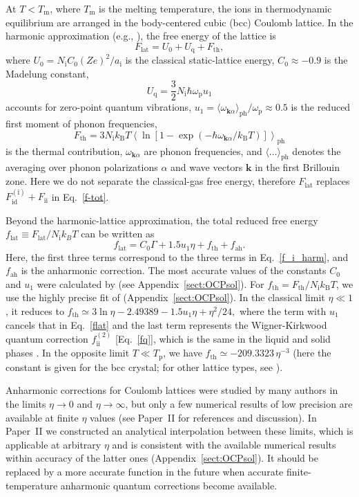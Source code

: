\documentclass[traditabstract]{aa}
\newcommand{\beq}{\begin{equation}}
\newcommand{\eeq}{\end{equation}}
\newcommand{\req}[1]{Eq.~\ref{#1}}
\newcommand{\aion}{a_\mathrm{i}}
\newcommand{\Nion}{N_\mathrm{i}}
\newcommand{\kB}{k_\mathrm{B}}
\newcommand{\omp}{\omega_\mathrm{p}}
\newcommand{\Tm}{T_\mathrm{m}}
\newcommand{\Tp}{T_\mathrm{p}}
\newcommand{\Uq}{U_\mathrm{q}}
\begin{document}
At $T< \Tm$, where $\Tm$ is the melting temperature, the ions
in thermodynamic equilibrium 
are arranged in the body-centered cubic (bcc) Coulomb lattice. 
In the harmonic approximation
(e.g., \citealp{Kittel-Q}),
the free energy of the lattice is
\beq
   F_\mathrm{lat} = U_0 + \Uq + F_\mathrm{th},
\label{f_i_harm}
\eeq
where
$U_0 = \Nion C_0 (Ze)^2/\aion$ is the classical static-lattice energy,
$C_0\approx-0.9$ is the Madelung constant, 
\beq
   \Uq=\frac32 \Nion \hbar\omp u_1
\label{uq}
\eeq
 accounts for zero-point quantum
vibrations,
$u_1=\langle\omega_{\bm{k}\alpha}\rangle_\mathrm{ph}/\omp\approx0.5$
is the reduced first moment of phonon frequencies,
\beq
   F_\mathrm{th} = 3 \Nion \kB T \left\langle\ln
   [1-\exp(-\hbar\omega_{\bm{k}\alpha} / \kB T)]
   \right\rangle_\mathrm{ph}
\eeq
is the thermal contribution, 
$\omega_{\bm{k}\alpha}$ are phonon frequencies, and
$\langle\ldots\rangle_\mathrm{ph}$ denotes the averaging
over phonon polarizations $\alpha$ and wave vectors $\bm{k}$ in
the first Brillouin zone. Here we do not separate the
classical-gas free energy, therefore $F_\mathrm{lat}$
replaces $F_\mathrm{id}^\mathrm{(i)} +
F_\mathrm{ii}^{\phantom{}}$ in \req{f-tot}. 

Beyond the harmonic-lattice approximation,
the total reduced free energy $f_\mathrm{lat}\equiv
F_\mathrm{lat}/\Nion k_B T$ can be written as
\beq
   f_\mathrm{lat} = C_0\Gamma + 1.5 u_1 \eta + f_{\mathrm{th}} +
   f_{\mathrm{ah}} .
\label{flat}
\eeq
Here, the first three terms correspond to the three terms in
\req{f_i_harm}, and $f_{\mathrm{ah}}$ is the anharmonic
correction. The most accurate values of the constants $C_0$
and $u_1$ were calculated by \citet{Baiko-disser} (see
Appendix~\ref{sect:OCPsol}). For
$f_{\mathrm{th}}=F_{\mathrm{th}}/\Nion\kB T$, we use the
highly precise fit of \citet{Baiko-ea01} 
(Appendix~\ref{sect:OCPsol}).
In the classical limit $\eta\ll1$, it reduces to
$
 f_\mathrm{th}\simeq 3\ln\eta-2.49389-1.5 u_1 \eta+\eta^2/24 ,
$
where the term with $u_1$ cancels that in \req{flat} and the
last term represents the Wigner-Kirkwood quantum
correction
$f_\mathrm{ii}^{(2)}$ [\req{fq}], which is the
same in 
the liquid and solid
phases \citep{PollockHansen}. In the opposite
limit $T\ll\Tp$, we have
$
   f_\mathrm{th} \simeq -209.3323\,\eta^{-3}
$
(here the constant is given for the bcc
crystal; for other lattice types, see
\citealp{Baiko-ea01}).

Anharmonic corrections for Coulomb lattices were studied by
many authors in the limits $\eta\to0$ and $\eta\to\infty$,
but only a few numerical results of low precision are
available at finite $\eta$ values (see Paper~II for
references and discussion). In Paper~II we constructed
an analytical interpolation between these limits, which is
applicable at arbitrary $\eta$ and is consistent with the
available numerical results within accuracy of the latter
ones
(Appendix~\ref{sect:OCPsol}).
It should be replaced by a more accurate function in
the future when accurate finite-temperature anharmonic
quantum corrections become available.
\end{document}

